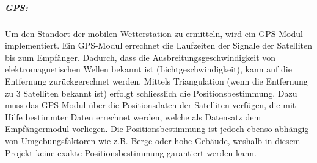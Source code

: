 \subparagraph{GPS:}
Um den Standort der mobilen Wetterstation zu ermitteln, wird ein GPS-Modul implementiert. Ein GPS-Modul errechnet die Laufzeiten der Signale der Satelliten bis zum Empfänger. Dadurch, dass die Ausbreitungsgeschwindigkeit von elektromagnetischen Wellen bekannt ist (Lichtgeschwindigkeit), kann auf die Entfernung zurückgerechnet werden. Mittels Triangulation (wenn die Entfernung zu 3 Satelliten bekannt ist) erfolgt schliesslich die Positionsbestimmung. Dazu muss das GPS-Modul über die Positionsdaten der Satelliten verfügen, die mit Hilfe bestimmter Daten errechnet werden, welche als Datensatz dem Empfängermodul vorliegen. Die Positionsbestimmung ist jedoch ebenso abhängig von Umgebungsfaktoren wie z.B. Berge oder hohe Gebäude, weshalb in diesem Projekt keine exakte Positionsbestimmung garantiert werden kann.\\